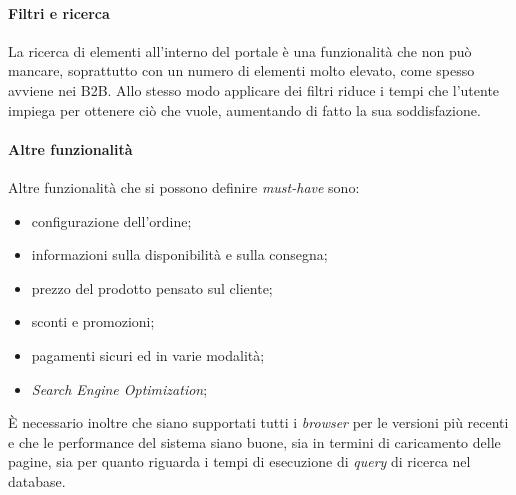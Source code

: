\paragraph{Filtri e ricerca}
La ricerca di elementi all'interno del portale è una funzionalità che non può mancare, soprattutto con un numero di elementi molto elevato, come spesso avviene nei B2B. Allo stesso modo applicare dei filtri riduce i tempi che l'utente impiega per ottenere ciò che vuole, aumentando di fatto la sua soddisfazione.

\paragraph{Altre funzionalità}
Altre funzionalità che si possono definire \textit{must-have} sono:
\begin{itemize}
	\item configurazione dell'ordine;
	\item informazioni sulla disponibilità e sulla consegna;
	\item prezzo del prodotto pensato sul cliente;
	\item sconti e promozioni;
	\item pagamenti sicuri ed in varie modalità;
	\item \textit{Search Engine Optimization};
\end{itemize}
È necessario inoltre che siano supportati tutti i \textit{browser} per le versioni più recenti e che le performance del sistema siano buone, sia in termini di caricamento delle pagine, sia per quanto riguarda i tempi di esecuzione di \textit{query} di ricerca nel database.

